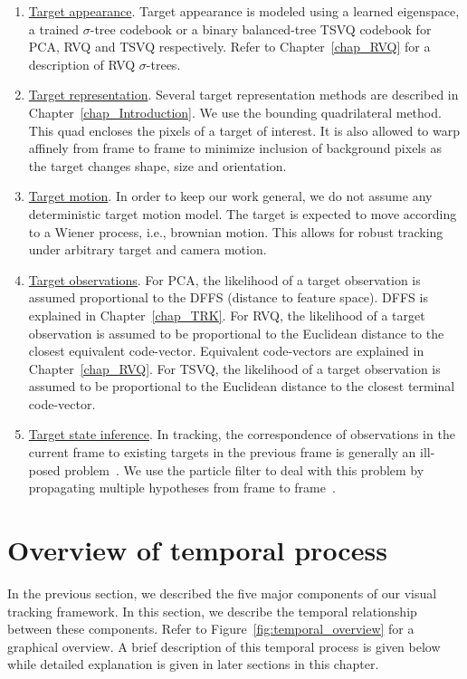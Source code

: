 \begin{enumerate}
\item \underline{ Target appearance}.  Target appearance is modeled using a learned eigenspace, a trained $\sigma$-tree codebook or a binary balanced-tree TSVQ codebook for PCA, RVQ and TSVQ respectively.  Refer to Chapter~\ref{chap_RVQ} for a description of RVQ  $\sigma$-trees.

\item \underline{Target representation}.  Several target representation methods are described in Chapter~\ref{chap_Introduction}.  We use the bounding quadrilateral method.  This quad encloses the pixels of a target of interest.  It is also allowed to warp affinely from frame to frame to minimize inclusion of background pixels as the target changes shape, size and orientation.

\item \underline{Target motion}.  In order to keep our work general, we do not assume any deterministic target motion model.  The target is expected to move according to a Wiener process, i.e., brownian motion.  This allows for robust tracking under arbitrary target and camera motion.

\item \underline{Target observations}.  For PCA, the likelihood of a target observation is assumed proportional to the DFFS (distance to feature space).  DFFS is explained in Chapter~\ref{chap_TRK}.  For RVQ, the likelihood of a target observation is assumed to be proportional to the Euclidean distance to the closest equivalent code-vector.  Equivalent code-vectors are explained in Chapter~\ref{chap_RVQ}.  For TSVQ, the likelihood of a target observation is assumed to be proportional to the Euclidean distance to the closest terminal code-vector.

\item \underline{Target state inference}.  In tracking, the correspondence of observations in the current frame to existing targets in the previous frame is generally an ill-posed problem~\cite{2005_CNF_TRK_Yang}.  We use the particle filter to deal with this problem by propagating multiple hypotheses from frame to frame~\cite{1998_JNL_Condensation_IsardBlake}.

\end{enumerate}

\section{Overview of temporal process}
In the previous section, we described the five major components of our visual tracking framework.  In this section, we describe the temporal relationship between these components.  Refer to Figure~\ref{fig:temporal_overview} for a graphical overview.  A brief description of this temporal process is given below while detailed explanation is given in later sections in this chapter.

